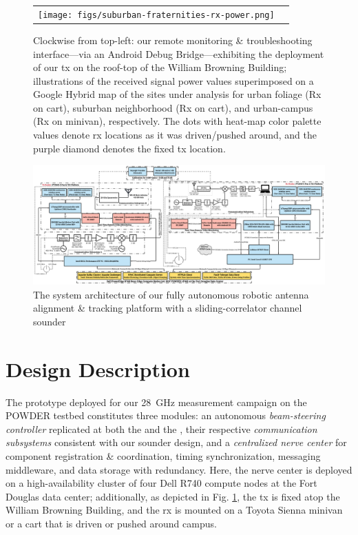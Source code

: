 \documentclass[10pt,twocolumn]{IEEEtran}
\begin{document}
\begin{figure}[t]
\begin{tabular}{cc}
\begin{minipage}{0.51\linewidth}
            \centering
            \texttt{[image: figs/suburban-fraternities-rx-power.png]}
        \end{minipage}
    \end{tabular}
    \caption{Clockwise from top-left: our remote monitoring \& troubleshooting interface---via an Android Debug Bridge---exhibiting the deployment of our \gls{tx} on the roof-top of the William Browning Building; illustrations of the received signal power values superimposed on a Google Hybrid map of the sites under analysis for urban foliage (Rx on cart), suburban neighborhood (Rx on cart), and urban-campus (Rx on minivan), respectively. The dots with heat-map color palette values denote \gls{rx} locations as it was driven/pushed around, and the purple diamond denotes the fixed \gls{tx} location.}
    \label{fig:TxRx}
    \vspace{-6mm}
\end{figure}

\begin{figure} [t]
    \centerline{
    \includegraphics[width=1.0\textwidth]{figs/odin-system-arch.pdf}}
    \vspace{-4mm}
    \caption{The system architecture of our fully autonomous robotic antenna alignment \& tracking platform with a sliding-correlator channel sounder}
    \label{fig: Arch}
    \vspace{-6mm}
\end{figure}

\vspace{\extraspacebeforesec}
\section{Design Description}\label{II}
The prototype deployed for our \SI{28}{\giga\hertz} measurement campaign on the POWDER testbed constitutes three modules: an autonomous \emph{beam-steering controller} replicated at both the  and the , their respective \emph{communication subsystems} consistent with our sounder design, and a \emph{centralized nerve center} for component registration \& coordination, timing synchronization, messaging middleware, and data storage with redundancy. Here, the nerve center is deployed on a high-availability cluster of four Dell R740 compute nodes at the Fort Douglas data center; additionally, as depicted in Fig. \ref{fig:TxRx}, the \gls{tx} is fixed atop the William Browning Building, and the \gls{rx} is mounted on a Toyota Sienna minivan or a cart that is driven or pushed around campus.
\end{document}
